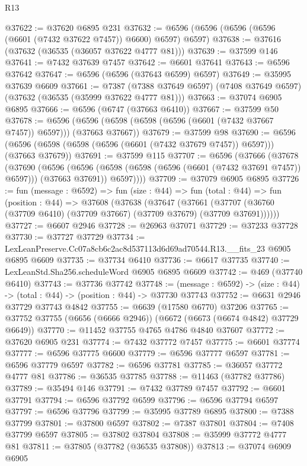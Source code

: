 \begin{lexlean}{R13}
\begin{coremodule}
@37622 := @37620 @6895 @231
@37632 := @6596 (@6596 (@6596 (@6596 (@6601 (@7432 @37622 @7457)) @6600) @6597) @6597)
@37638 := @37616 (@37632 (@36535 (@36057 @37622 @4777 @81)))
@37639 := @37599 @146
@37641 := @7432 @37639 @7457
@37642 := @6601 @37641
@37643 := @6596 @37642
@37647 := @6596 (@6596 (@37643 @6599) @6597)
@37649 := @35995 @37639 @6609
@37661 := @7387
    (@7388 @37649 @6597)
    (@7408 @37649 @6597)
    (@37632 (@36535 (@35999 @37622 @4777 @81)))
@37663 := @37074 @6905 @6895
@37666 := @6596 (@6747 (@37663 @6410))
@37667 := @37599 @50
@37678 := @6596 (@6596 (@6598 (@6598 (@6596 (@6601 (@7432 @37667 @7457)) @6597))) (@37663 @37667))
@37679 := @37599 @98
@37690 := @6596 (@6596 (@6598 (@6598 (@6596 (@6601 (@7432 @37679 @7457)) @6597))) (@37663 @37679))
@37691 := @37599 @115
@37707 := @6596
    (@37666
      (@37678
        (@37690
          (@6596
            (@6596 (@6598 (@6598 (@6596 (@6601 (@7432 @37691 @7457)) @6597))) (@37663 @37691))
            @6597))))
@37709 := @37079 @6905 @6895
@37726 := fun (message : @6592) =>
  fun (size : @44) =>
  fun (total : @44) =>
  fun (position : @44) =>
  @37608
    (@37638
      (@37647
        (@37661 (@37707 (@36760 (@37709 @6410) (@37709 @37667) (@37709 @37679) (@37709 @37691))))))
@37727 := @6607 @2946
@37728 := @26963 @37071
@37729 := @37233 @37728
@37730 := @37727 @37729
@37734 := LexLeanPreserve.Cc07a8cb6c2ac8d537113d6d69ad70544.R13.__fits_23 @6905 @6895 @6609
@37735 := @37734 @6410
@37736 := @6617 @37735
@37740 := LexLeanStd.Sha256.scheduleWord @6905 @6895 @6609
@37742 := @469 (@37740 @6410)
@37743 := @37736 @37742
@37748 := (message : @6592) -> (size : @44) -> (total : @44) -> (position : @44) -> @37730 @37743
@37752 := @6631 @2946 @37729 @37743 @4842
@37755 := @6639 (@17580 @6770) @37206
@37765 := @37752 @37755 (@6656 (@6666 @2946)) (@6672 (@6673 (@6674 @4842) @37729 @6649))
@37770 := @11452 @37755 @4765 @4786 @4840 @37607
@37772 := @37620 @6905 @231
@37774 := @7432 @37772 @7457
@37775 := @6601 @37774
@37777 := @6596 @37775 @6600
@37779 := @6596 @37777 @6597
@37781 := @6596 @37779 @6597
@37782 := @6596 @37781
@37785 := @36057 @37772 @4777 @81
@37786 := @36535 @37785
@37788 := @11463 (@37782 @37786)
@37789 := @35494 @146
@37791 := @7432 @37789 @7457
@37792 := @6601 @37791
@37794 := @6596 @37792 @6599
@37796 := @6596 @37794 @6597
@37797 := @6596 @37796
@37799 := @35995 @37789 @6895
@37800 := @7388 @37799
@37801 := @37800 @6597
@37802 := @7387 @37801
@37804 := @7408 @37799 @6597
@37805 := @37802 @37804
@37808 := @35999 @37772 @4777 @81
@37811 := @37805 (@37782 (@36535 @37808))
@37813 := @37074 @6909 @6905

\end{coremodule}
\end{lexlean}
